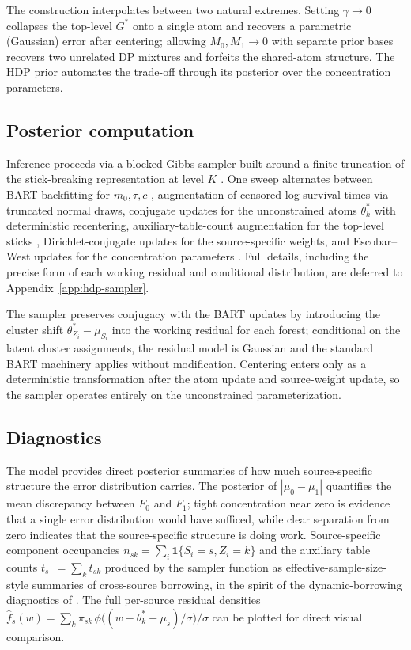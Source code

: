 \documentclass[11pt]{article}
\begin{document}
The construction interpolates between two natural extremes. Setting $\gamma \to 0$ collapses the top-level $G^*$ onto a single atom and recovers a parametric (Gaussian) error after centering; allowing $M_0, M_1 \to 0$ with separate prior bases recovers two unrelated DP mixtures and forfeits the shared-atom structure. The HDP prior automates the trade-off through its posterior over the concentration parameters.

\subsection{Posterior computation}
\label{sec:hdp-computation}

Inference proceeds via a blocked Gibbs sampler built around a finite truncation of the stick-breaking representation at level $K$ \citep{ishwaran2001gibbs}. One sweep alternates between BART backfitting for $m_0, \tau, c$ \citep{chipman2010bart}, augmentation of censored log-survival times via truncated normal draws, conjugate updates for the unconstrained atoms $\theta_k^*$ with deterministic recentering, auxiliary-table-count augmentation for the top-level sticks \citep{teh2006hierarchical, antoniak1974mixtures}, Dirichlet-conjugate updates for the source-specific weights, and Escobar--West updates for the concentration parameters \citep{escobar1995bayesian}. Full details, including the precise form of each working residual and conditional distribution, are deferred to Appendix~\ref{app:hdp-sampler}.

The sampler preserves conjugacy with the BART updates by introducing the cluster shift $\theta_{Z_i}^* - \mu_{S_i}$ into the working residual for each forest; conditional on the latent cluster assignments, the residual model is Gaussian and the standard BART machinery applies without modification. Centering enters only as a deterministic transformation after the atom update and source-weight update, so the sampler operates entirely on the unconstrained parameterization.

\subsection{Diagnostics}
\label{sec:hdp-diagnostics}

The model provides direct posterior summaries of how much source-specific structure the error distribution carries. The posterior of $|\mu_0 - \mu_1|$ quantifies the mean discrepancy between $F_0$ and $F_1$; tight concentration near zero is evidence that a single error distribution would have sufficed, while clear separation from zero indicates that the source-specific structure is doing work. Source-specific component occupancies $n_{sk} = \sum_i \mathbf{1}\{S_i = s, Z_i = k\}$ and the auxiliary table counts $t_{s\cdot} = \sum_k t_{sk}$ produced by the sampler function as effective-sample-size-style summaries of cross-source borrowing, in the spirit of the dynamic-borrowing diagnostics of \citet{hupf2021bayesian}. The full per-source residual densities $\hat f_s(w) = \sum_k \pi_{sk}\, \phi\big((w - \theta_k^* + \mu_s)/\sigma\big)/\sigma$ can be plotted for direct visual comparison.
\end{document}
